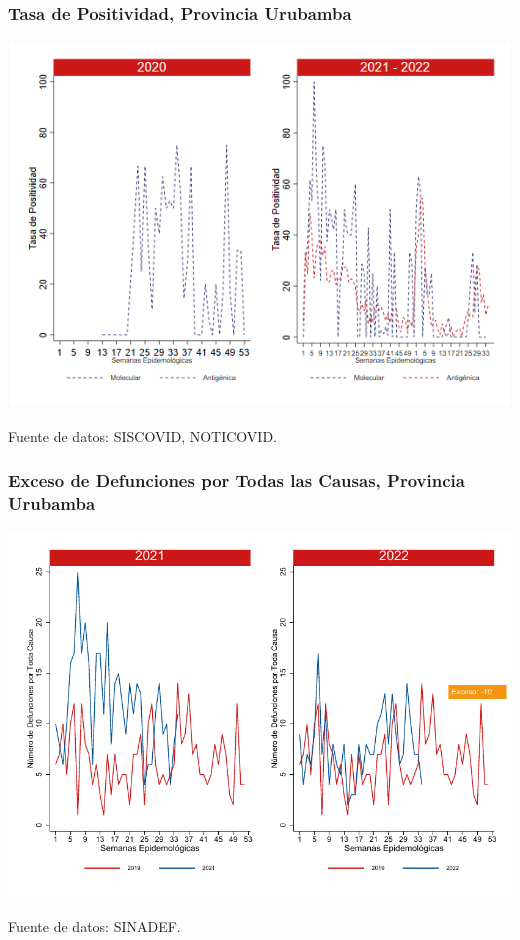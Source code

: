 \documentclass[xcolor=table]{beamer}
\begin{document}
\begin{frame}
	\frametitle{Tasa de Positividad, Provincia Urubamba}
	\vspace{-.5cm}
	\begin{center}
		\includegraphics[width=0.8\linewidth, trim={0cm .5cm 0cm 0.2cm},clip]{../figuras/positividad_20_21_13.png}
	\end{center}
	{\tiny Fuente de datos: SISCOVID, NOTICOVID.}
\end{frame}

\begin{frame}
	\frametitle{Exceso de Defunciones por Todas las Causas, Provincia Urubamba}
	\vspace{-.5cm}
	\begin{center}
		\includegraphics[width=0.8\linewidth, trim={0cm .5cm 0cm 0.2cm},clip]{../figuras/exceso_13.pdf}
	\end{center}
	{\tiny Fuente de datos: SINADEF.} \hyperlink{indice}{} 
	
	\hyperlink{indicadores_provinciales}{}
\end{frame}
\end{document}
